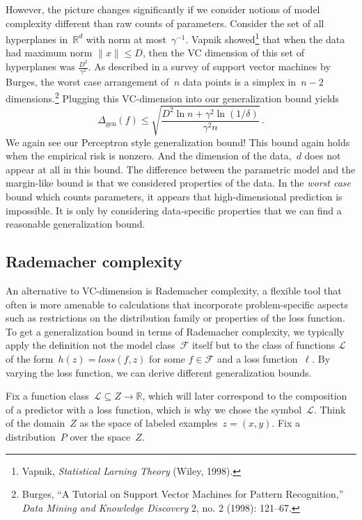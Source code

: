 \documentclass{tufte-book}
\begin{document}
However, the picture changes significantly if we consider notions of
model complexity different than raw counts of parameters. Consider the
set of all hyperplanes in~\(\mathbb{R}^d\) with norm at
most~\(\gamma^{-1}\). Vapnik showed\footnote{Vapnik, \emph{Statistical
  Larning Theory} (Wiley, 1998).} that when the data had maximum norm
\(\|x\|\leq D\), then the VC dimension of this set of hyperplanes was
\(\frac{D^2}{\gamma^2}\). As described in a survey of support vector
machines by Burges, the worst case arrangement of~\(n\) data points is a
simplex in~\(n-2\) dimensions.\footnote{Burges, {``A Tutorial on Support
  Vector Machines for Pattern Recognition,''} \emph{Data Mining and
  Knowledge Discovery} 2, no. 2 (1998): 121--67.} Plugging this
VC-dimension into our generalization bound yields \[
\Delta_{\mathrm{gen}}(f)\le \sqrt{\frac{D^2\ln n+\gamma^2\ln(1/\delta)}{\gamma^2 n}}\,.
\] We again see our Perceptron style generalization bound! This bound
again holds when the empirical risk is nonzero. And the dimension of the
data,~\(d\) does not appear at all in this bound. The difference between
the parametric model and the margin-like bound is that we considered
properties of the data. In the \emph{worst case} bound which counts
parameters, it appears that high-dimensional prediction is impossible.
It is only by considering data-specific properties that we can find a
reasonable generalization bound.

\hypertarget{rademacher-complexity}{%
\subsection{Rademacher complexity}\label{rademacher-complexity}}


An alternative to VC-dimension is Rademacher complexity, a flexible tool
that often is more amenable to calculations that incorporate
problem-specific aspects such as restrictions on the distribution family
or properties of the loss function. To get a generalization bound in
terms of Rademacher complexity, we typically apply the definition not
the model class~\(\mathcal{F}\) itself but to the class of functions
\(\mathcal{L}\) of the form~\(h(z) = \mathit{loss}(f, z)\) for some
\(f\in\mathcal{F}\) and a loss function~\(\ell.\) By varying the loss
function, we can derive different generalization bounds.

Fix a function class~\(\mathcal{L}\subseteq Z\to\mathbb{R}\), which will
later correspond to the composition of a predictor with a loss function,
which is why we chose the symbol~\(\mathcal{L}\). Think of the
domain~\(Z\) as the space of labeled examples~\(z=(x,y)\). Fix a
distribution~\(P\) over the space~\(Z\).
\end{document}
